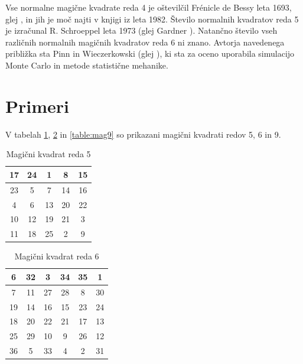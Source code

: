 \documentclass[a4paper,12pt]{article}
\newenvironment{magic}[3]
{\begin{table}[!ht]
   \centering
   \caption{#2}
   \label{#3}
   \large
   \begin{tabular}{|*{#1}{c|}}
   \hline}
{\end{tabular}
   \normalsize
\end{table}}
\theoremstyle{definition}
\theoremstyle{plain}
\begin{document}
Vse normalne magične kvadrate reda 4 je oštevilčil Frénicle de Bessy
leta 1693, glej \cite{bessy}, in jih je moč najti v knjigi \cite{berlekamp}
iz leta 1982. Število normalnih kvadratov reda 5 je izračunal
R. Schroeppel leta 1973 (glej Gardner \cite{gardner}).
Natančno število vseh različnih normalnih magičnih kvadratov reda 6 ni znano.
Avtorja navedenega približka sta Pinn in Wieczerkowski (glej \cite{pinn}), ki
sta za oceno uporabila simulacijo Monte Carlo in metode statistične mehanike.


\section{Primeri}

V tabelah \ref{table:mag5}, \ref{table:mag6} in \ref{table:mag9} so prikazani
magični kvadrati redov 5, 6 in 9. %

\begin{magic}{5}{Magični kvadrat reda 5}{table:mag5}
17 & 24 &  1 &  8 & 15 \\\hline
23 &  5 &  7 & 14 & 16 \\\hline
 4 &  6 & 13 & 20 & 22 \\\hline
10 & 12 & 19 & 21 &  3 \\\hline
11 & 18 & 25 &  2 &  9 \\\hline
\end{magic}


\begin{magic}{6}{Magični kvadrat reda 6}{table:mag6}
 6 & 32 &  3 & 34 & 35 &  1 \\\hline
 7 & 11 & 27 & 28 &  8 & 30 \\\hline
 19 & 14 & 16 & 15 & 23 & 24 \\\hline
 18 & 20 & 22 & 21 & 17 & 13 \\\hline
 25 & 29 & 10 &  9 & 26 & 12 \\\hline
 36 &  5 & 33 &  4 &  2 & 31 \\\hline
 \end{magic}
\end{document}
